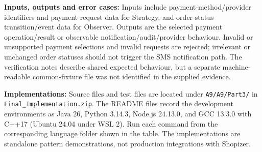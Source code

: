 \documentclass[11pt,a4paper]{article}
\begin{document}
\textbf{Inputs, outputs and error cases:} Inputs include payment-method/provider identifiers and payment request data for Strategy, and order-status transition/event data for Observer. Outputs are the selected payment operation/result or observable notification/audit/provider behaviour. Invalid or unsupported payment selections and invalid requests are rejected; irrelevant or unchanged order statuses should not trigger the SMS notification path. The verification notes describe shared expected behaviour, but a separate machine-readable common-fixture file was not identified in the supplied evidence.

\textbf{Implementations:} Source files and test files are located under \texttt{A9/A9/Part3/} in \texttt{Final\_\allowbreak{}Implementation.\allowbreak{}zip}. The README files record the development environments as Java 26, Python 3.14.3, Node.js 24.13.0, and GCC 13.3.0 with C++17 (Ubuntu 24.04 under WSL 2). Run each command from the corresponding language folder shown in the table. The implementations are standalone pattern demonstrations, not production integrations with Shopizer.
\end{document}
